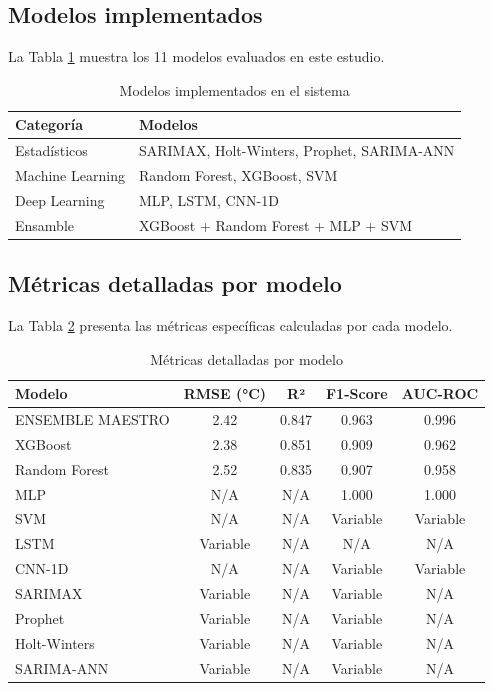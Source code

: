 \documentclass[11pt, a4paper]{article}
\begin{document}
\subsection{Modelos implementados}

La Tabla \ref{tab:modelos} muestra los 11 modelos evaluados en este estudio.

\begin{table}[h]
\centering
\caption{Modelos implementados en el sistema}
\label{tab:modelos}
\begin{tabular}{ll}
\toprule
\textbf{Categoría} & \textbf{Modelos} \\
\midrule
Estadísticos & SARIMAX, Holt-Winters, Prophet, SARIMA-ANN \\
Machine Learning & Random Forest, XGBoost, SVM \\
Deep Learning & MLP, LSTM, CNN-1D \\
Ensamble & XGBoost + Random Forest + MLP + SVM \\
\bottomrule
\end{tabular}
\end{table}

\subsection{Métricas detalladas por modelo}

La Tabla \ref{tab:metricas_detalle} presenta las métricas específicas calculadas por cada modelo.

\begin{table}[h]
\centering
\small
\caption{Métricas detalladas por modelo}
\label{tab:metricas_detalle}
\begin{tabular}{lcccc}
\toprule
\textbf{Modelo} & \textbf{RMSE (°C)} & \textbf{R²} & \textbf{F1-Score} & \textbf{AUC-ROC} \\
\midrule
ENSEMBLE MAESTRO & 2.42 & 0.847 & 0.963 & 0.996 \\
XGBoost & 2.38 & 0.851 & 0.909 & 0.962 \\
Random Forest & 2.52 & 0.835 & 0.907 & 0.958 \\
MLP & N/A & N/A & 1.000 & 1.000 \\
SVM & N/A & N/A & Variable & Variable \\
LSTM & Variable & N/A & N/A & N/A \\
CNN-1D & N/A & N/A & Variable & Variable \\
SARIMAX & Variable & N/A & Variable & N/A \\
Prophet & Variable & N/A & Variable & N/A \\
Holt-Winters & Variable & N/A & Variable & N/A \\
SARIMA-ANN & Variable & N/A & Variable & N/A \\
\bottomrule
\end{tabular}
\end{table}
\end{document}
